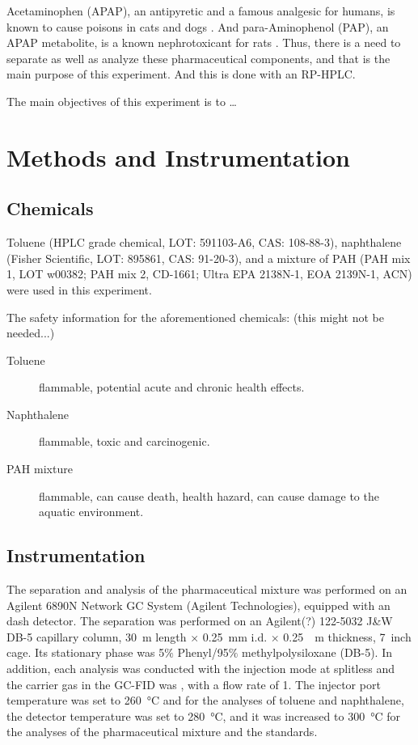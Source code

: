 \documentclass[a4paper, 12pt]{article}
\begin{document}
Acetaminophen (APAP), an antipyretic and a famous analgesic for humans, is known to cause poisons in cats and dogs \cite{dogs-cats}. And para-Aminophenol (PAP), an APAP metabolite, is a known nephrotoxicant for rats \cite{rats}. Thus, there is a need to separate as well as analyze these pharmaceutical components, and that is the main purpose of this experiment. And this is done with an RP-HPLC.

The main objectives of this experiment is to \ldots{}


\section{Methods and Instrumentation}

\subsection{Chemicals}
Toluene (HPLC grade chemical, LOT: 591103-A6, CAS: 108-88-3), naphthalene (Fisher Scientific, LOT: 895861, CAS: 91-20-3), and a mixture of PAH (PAH mix 1, LOT w00382; PAH mix 2, CD-1661; Ultra EPA 2138N-1, EOA 2139N-1, ACN) were used in this experiment.

The safety information for the aforementioned chemicals: (this might not be needed...)
\begin{description}
	\item[Toluene] flammable, potential acute and chronic health effects.
	\item[Naphthalene] flammable, toxic and carcinogenic.
	\item[PAH mixture] flammable, can cause death, health hazard, can cause damage to the aquatic environment.
\end{description}

\subsection{Instrumentation}
The separation and analysis of the pharmaceutical mixture was performed on an Agilent 6890N Network GC System (Agilent Technologies), equipped with an dash detector. The separation was performed on an Agilent(?) 122-5032 J\&W DB-5 capillary column, \SI{30}{m} length $\times$ \SI{0.25}{mm} i.d. $\times$ \SI{0.25}{\mu{}m} thickness, \SI{7}{inch} cage. Its stationary phase was 5$\%$ Phenyl/95$\%$ methylpolysiloxane (DB-5). In addition, each analysis was conducted with the injection mode at splitless and the carrier gas in the GC-FID was , with a flow rate of \SI{1}{}. The injector port temperature was set to \SI{260}{\degreeCelsius} and for the analyses of toluene and naphthalene, the detector temperature was set to \SI{280}{\degreeCelsius}, and it was increased to \SI{300}{\degreeCelsius} for the analyses of the pharmaceutical mixture and the standards.
\end{document}
